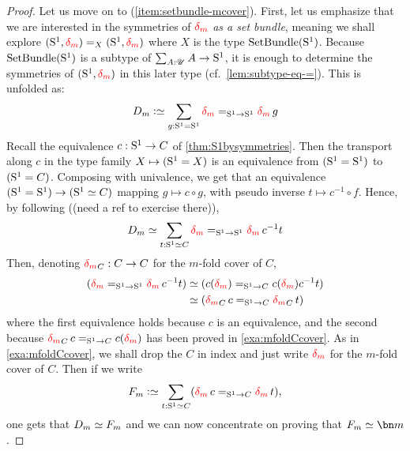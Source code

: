 \begin{proof}
  \def\blank{{-}}%
  \def\mono{\hookrightarrow}%
  \def\bigetop#1{\overline{#1}}%
  \def\bigptoe#1{\widetilde{#1}}%
  \def\inv#1{#1^{-1}}%
  \def\myq{\mathfrak m}%
  \renewcommand{\trp}[2][\null]{%
    \ifx#1\null\mathop{\mathit{trp}_{#2}}%
    \else\mathop{\mathit{trp}_{#1,#2}}%
    \fi%
  }%
  \def\bigetop#1{{#1}}%
  \def\bigptoe#1{{#1}}%
  \def\etop#1{{#1}}%
  \def\ptoe#1{{#1}}%
  Let us move on to (\ref{item:setbundle-mcover}). %
  First, let us emphasize that we are interested in the symmetries of
  $\dg{m}$ {\em as a set bundle}, meaning we shall explore
  $(\Sc,\dg{m}) =_X (\Sc,\dg{m})$ where $X$ is the type
  $\mathrm{SetBundle}({\mathrm{S}^1})$.
  Because $\mathrm{SetBundle}({\mathrm{S}^1})$ is a subtype of $\sum_{A:{\mathscr{U}}}A\to {\mathrm{S}^1}$, it
  is enough to determine the symmetries of $(\Sc,\dg{m})$ in this later
  type (cf.\ \cref{lem:subtype-eq-=}). This is unfolded as:
  \begin{displaymath}
    D_m \defequi \sum_{g:\Sc = \Sc}\dg{m} =_{\Sc \to \Sc} \dg{m}\ptoe g 
  \end{displaymath}
  Recall the equivalence $c: {\mathrm{S}^1} \to C$ of
  \cref{thm:S1bysymmetries}. Then the transport along $\etop c$ in the
  type family $X\mapsto ({\mathrm{S}^1}=X)$ is an equivalence from $({\mathrm{S}^1} = {\mathrm{S}^1})$
  to $({\mathrm{S}^1} = C)$. Composing with univalence, we get that an
  equivalence $({\mathrm{S}^1}={\mathrm{S}^1}) \to ({\mathrm{S}^1} \simeq C)$ mapping
  $g\mapsto c\circ \ptoe g$, with pseudo inverse
  $t \mapsto \bigetop{\inv c \circ f}$. Hence, by following ((need a
  ref to exercise there)),
  \begin{displaymath}
    D_m \weq  \sum_{t:\Sc \weq C} \dg{m} =_{\Sc\to \Sc} \dg{m}\inv c t
  \end{displaymath}
  Then, denoting $\dg{m}_C: C \to C$ for the $m$-fold cover of $C$,
  \begin{displaymath}
    \begin{split}
      (\dg{m} =_{\Sc\to \Sc} \dg{m}\inv c t) %
      &\weq (c (\dg{m}) =_{\Sc\to C} c (\dg{m}) \inv c t)
      \\
      &\weq (\dg{m}_Cc =_{\Sc\to C} \dg{m}_C t)
    \end{split}
  \end{displaymath}
  where the first equivalence holds because $c$ is an equivalence, and
  the second because $\dg{m}_Cc =_{\Sc\to C} c (\dg{m})$ has been
  proved in \cref{exa:mfoldCcover}. As in \cref{exa:mfoldCcover}, we
  shall drop the $C$ in index and just write $\dg{m}$ for the
  $m$-fold cover of $C$. Then if we write
  \begin{displaymath}
    F_m \defequi \sum_{t:\Sc \weq C}(\dg{m}c =_{\Sc\to C} \dg{m} t),
  \end{displaymath}
  one gets that $D_m \simeq F_m$ and we can now concentrate on proving that
  $F_m \weq \bn m$.


\end{proof}
